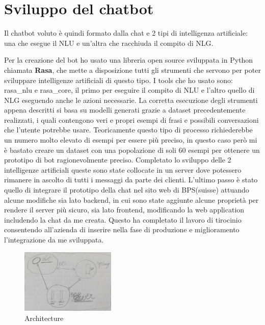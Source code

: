 \section{Sviluppo del chatbot}
Il chatbot voluto è quindi formato dalla chat e 2 tipi di intelligenza artificiale: una che esegue il NLU e un'altra che racchiuda il compito di NLG.

Per la creazione del bot ho usato una libreria open source sviluppata in Python chiamata \textbf{Rasa}, che mette a disposizione tutti gli strumenti che servono per poter sviluppare intelligenze artificiali di questo tipo. I tools che ho usato sono: rasa\_nlu e rasa\_core, il primo per eseguire il compito di NLU e l'altro quello di NLG eseguendo anche le azioni necessarie.
La corretta esecuzione degli strumenti appena descritti si basa su modelli generati grazie a dataset precedentemente realizzati, i quali contengono veri e propri esempi di frasi e possibili conversazioni che l'utente potrebbe usare.
Teoricamente questo tipo di processo richiederebbe un numero molto elevato di esempi per essere più preciso, in questo caso però mi è bastato creare un dataset con una popolazione di soli 60 esempi per ottenere un prototipo di bot ragionevolmente preciso.
Completato lo sviluppo delle 2 intelligenze artificiali queste sono state collocate in un server dove potessero rimanere in ascolto di tutti i messaggi da parte dei clienti.
L'ultimo passo è stato quello di integrare il prototipo della chat nel sito web di BPS(suisse) attuando alcune modifiche sia lato backend, in cui sono state aggiunte alcune proprietà per rendere il server più sicuro, sia lato frontend, modificando la web application includendo la chat da me creata.
Questo ha completato il lavoro di tirocinio consentendo all'azienda di inserire nella fase di produzione e miglioramento l'integrazione da me sviluppata.
\begin{figure}[H]
 \centering
    \includegraphics[width=0.4\textwidth]{img/last_architecture.jpg}
 \caption{Architecture}
\end{figure}

